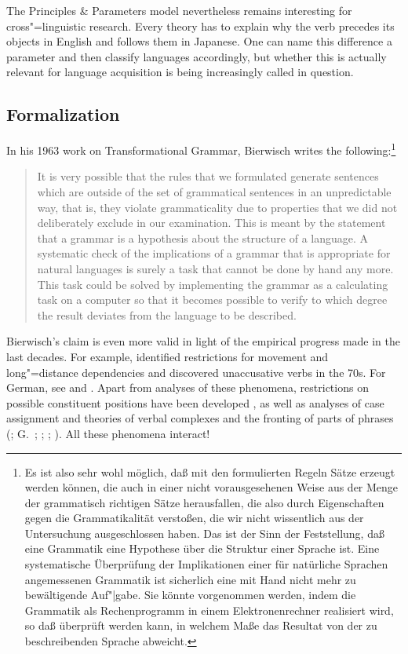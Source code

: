 The Principles \& Parameters model nevertheless remains interesting for cross"=linguistic
research. Every theory has to explain why the verb precedes its objects in English and follows them in 
Japanese. One can name this difference a parameter and then classify languages
accordingly, but whether this is actually relevant for language acquisition is being increasingly called in question.

\subsection{Formalization}
\label{sec-formalization-gb}

In his 1963 work on Transformational Grammar, Bierwisch writes the following:\footnote{%
Es ist also sehr wohl möglich, daß mit den formulierten Regeln Sätze erzeugt werden können,
die auch in einer nicht vorausgesehenen Weise aus der Menge der grammatisch richtigen Sätze herausfallen,
die also durch Eigenschaften gegen die Grammatikalität verstoßen, die wir nicht wissentlich aus
der Untersuchung ausgeschlossen haben. Das ist der Sinn der Feststellung, daß eine Grammatik
eine Hypothese über die Struktur einer Sprache ist. Eine systematische Überprüfung der Implikationen
einer für natürliche Sprachen angemessenen Grammatik ist sicherlich eine mit Hand nicht mehr
zu bewältigende Auf"|gabe. Sie könnte vorgenommen werden, indem die Grammatik als Rechenprogramm in einem
Elektronenrechner realisiert wird, so daß überprüft werden kann, in welchem Maße das Resultat
von der zu beschreibenden Sprache abweicht.}
\begin{quote}
It is very possible that the rules that we formulated generate
sentences which are outside of the set of grammatical sentences in an
unpredictable way, that is, they violate grammaticality due to
properties that we did not deliberately exclude in our examination. This
is meant by the statement that a grammar is a hypothesis about the
structure of a language. A systematic check of the implications of a
grammar that is appropriate for natural languages is surely a task that
cannot be done by hand any more. This task could be solved by
implementing the grammar as a calculating task on a computer so that it
becomes possible to verify to which degree the result deviates from the
language to be described. \citep*[]{Bierwisch63a}
\end{quote}
Bierwisch's claim is even more valid in light of the empirical progress made in the last decades. For example,
\citet{Ross67a} identified restrictions for movement and long"=distance dependencies and \citet{Perlmutter78} discovered
unaccusative verbs in the 70s. For German, see  and .
Apart from analyses of these phenomena, restrictions on possible constituent positions have been developed
\citep{Lenerz77}, as well as analyses of case assignment \citep*{YMJ87,Meurers99b,Prze99} and theories of
verbal complexes and the fronting of parts of phrases  (\citealp{Evers75a,Grewendorf88a,HN94a,Kiss95a}; G.\ \citealp{GMueller98a};
\citealp{Meurers99c}; \citealp{Mueller99a,Mueller2002b}; \citealp{deKuthy2002a}). All these
phenomena interact!

